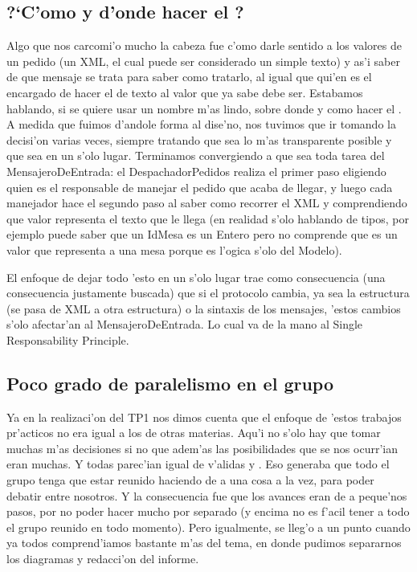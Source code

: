 \subsection{?`C'omo y d'onde hacer el ?}
Algo que nos carcomi'o mucho la cabeza fue c'omo darle sentido a los valores de un pedido (un XML, el cual puede ser considerado un simple texto) y as'i saber de que mensaje se trata para saber como tratarlo, al igual que qui'en es el encargado de hacer el  de texto al valor que ya sabe debe ser. Estabamos hablando, si se quiere usar un nombre m'as lindo, sobre donde y como hacer el . A medida que fuimos d'andole forma al dise'no, nos tuvimos que ir tomando la decisi'on varias veces, siempre tratando que sea lo m'as transparente posible y que sea en un s'olo lugar. Terminamos convergiendo a que sea toda tarea del MensajeroDeEntrada: el DespachadorPedidos realiza el primer paso eligiendo quien es el responsable de manejar el pedido que acaba de llegar, y luego cada manejador hace el segundo paso al saber como recorrer el XML y comprendiendo que valor representa el texto que le llega (en realidad s'olo hablando de tipos, por ejemplo puede saber que un IdMesa es un Entero pero no comprende que es un valor que representa a una mesa porque es l'ogica s'olo del Modelo). 

El enfoque de dejar todo 'esto en un s'olo lugar trae como consecuencia (una consecuencia justamente buscada) que si el protocolo cambia, ya sea la estructura (se pasa de XML a otra estructura) o la sintaxis de los mensajes, 'estos cambios s'olo afectar'an al MensajeroDeEntrada. Lo cual va de la mano al Single Responsability Principle.


\subsection{Poco grado de paralelismo en el grupo}
Ya en la realizaci'on del TP1 nos dimos cuenta que el enfoque de 'estos trabajos pr'acticos no era igual a los de otras materias. Aqu'i no s'olo hay que tomar muchas m'as decisiones si no que adem'as las posibilidades que se nos ocurr'ian eran muchas. Y todas parec'ian igual de v'alidas y . Eso generaba que todo el grupo tenga que estar reunido haciendo de a una cosa a la vez, para poder debatir entre nosotros. Y la consecuencia fue que los avances eran de a peque'nos pasos, por no poder hacer mucho por separado (y encima no es f'acil tener a todo el grupo reunido en todo momento). Pero igualmente, se lleg'o a un punto cuando ya todos comprend'iamos bastante m'as del tema, en donde pudimos separarnos los diagramas y redacci'on del informe. 

